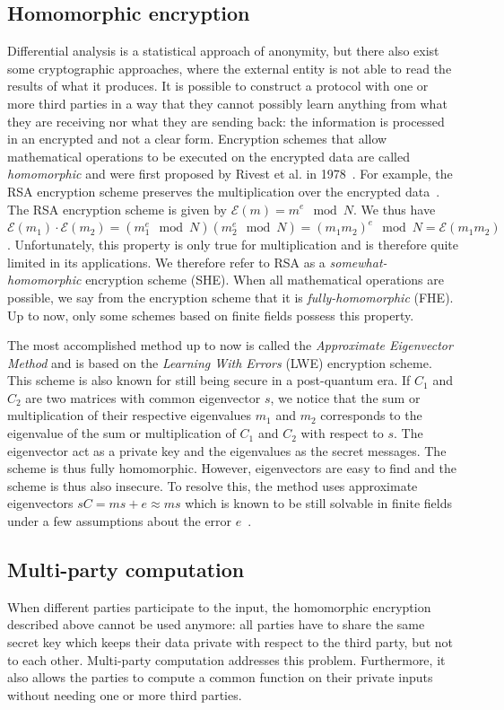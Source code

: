 \subsection{Homomorphic encryption}
Differential analysis is a statistical approach of anonymity, but there also exist some cryptographic approaches, where the external entity is not able to read the results of what it produces. It is possible to construct a protocol with one or more third parties in a way that they cannot possibly learn anything from what they are receiving nor what they are sending back: the information is processed in an encrypted and not a clear form. Encryption schemes that allow mathematical operations to be executed on the encrypted data are called \emph{homomorphic} and were first proposed by Rivest et al. in 1978~\cite{Rivest1978}. For example, the RSA encryption scheme preserves the multiplication over the encrypted data~\cite{Rivest:1978:MOD:359340.359342}. The RSA encryption scheme is given by $\mathscr{E}(m)=m^e \mod N$. We thus have $\mathscr{E}(m_1) \cdot  \mathscr{E}(m_2) = \left(m_1^e \mod N \right)\left(m_2^e \mod N \right) = \left(m_1m_2\right)^e \mod N = \mathscr{E}(m_1m_2)$. Unfortunately, this property is only true for multiplication and is therefore quite limited in its applications. We therefore refer to RSA as a \emph{somewhat-homomorphic} encryption scheme (SHE). When all mathematical operations are possible, we say from the encryption scheme that it is \emph{fully-homomorphic} (FHE). Up to now, only some schemes based on finite fields possess this property. 

The most accomplished method up to now is called the \emph{Approximate Eigenvector Method} and is based on the \emph{Learning With Errors} (LWE) encryption scheme. This scheme is also known for still being secure in a post-quantum era. If $C_1$ and $C_2$ are two matrices with common eigenvector $s$, we notice that the sum or multiplication of their respective eigenvalues $m_1$ and $m_2$ corresponds to the eigenvalue of the sum or multiplication of $C_1$ and $C_2$ with respect to $s$. The eigenvector act as a private key and the eigenvalues as the secret messages. The scheme is thus fully homomorphic. However, eigenvectors are easy to find and the scheme is thus also insecure. To resolve this, the method uses approximate eigenvectors $sC=ms+e\approx ms$ which is known to be still solvable in finite fields under a few assumptions about the error $e$~\cite{Regev:2005:LLE:1060590.1060603}.

\subsection{Multi-party computation}
When different parties participate to the input, the homomorphic encryption described above cannot be used anymore: all parties have to share the same secret key which keeps their data private with respect to the third party, but not to each other. Multi-party computation addresses this problem. Furthermore, it also allows the parties to compute a common function on their private inputs without needing one or more third parties. 

